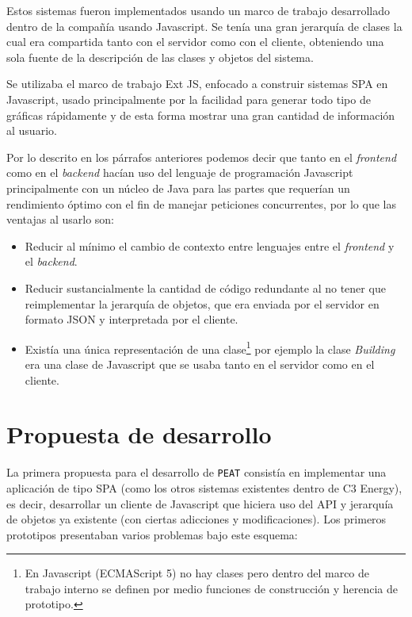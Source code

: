 Estos sistemas fueron implementados usando un marco de trabajo desarrollado dentro
de la compañía usando Javascript. Se tenía una gran jerarquía de clases
la cual era compartida tanto con el servidor como con el cliente, obteniendo una
sola fuente de la descripción de las clases y objetos del sistema.

Se utilizaba el marco de trabajo Ext JS, enfocado a construir sistemas SPA
en Javascript, usado principalmente por la facilidad para generar
todo tipo de gráficas rápidamente y de esta forma mostrar una gran cantidad
de información al usuario.

Por lo descrito en los párrafos anteriores podemos decir que tanto en el
\textit{frontend} como en el \textit{backend} hacían uso del lenguaje
de programación Javascript principalmente con un núcleo de Java para las partes
que requerían un rendimiento óptimo con el fin de manejar peticiones concurrentes,
por lo que las ventajas al usarlo son:

\begin{itemize}
\item Reducir al mínimo el cambio de contexto entre lenguajes entre
  el \textit{frontend} y el \textit{backend}.
\item Reducir sustancialmente la cantidad de código redundante al no
  tener que reimplementar la jerarquía de objetos, que era enviada
  por el servidor en formato JSON y interpretada por el cliente.
\item Existía una única representación de una clase\footnote{En Javascript
  (ECMAScript 5) no hay clases pero dentro del marco de trabajo interno se definen
  por medio funciones de construcción y herencia de prototipo.} por ejemplo la
  clase \textit{Building} era una clase de Javascript que se usaba
  tanto en el servidor como en el cliente.
\end{itemize}

\section{Propuesta de desarrollo}
La primera propuesta para el desarrollo de \texttt{PEAT} consistía
en implementar una aplicación de tipo SPA (como los otros sistemas
existentes dentro de C3 Energy), es decir, desarrollar un cliente
de Javascript que hiciera uso del API y jerarquía de objetos
ya existente (con ciertas adicciones y modificaciones).
Los primeros prototipos presentaban varios problemas bajo este esquema:


